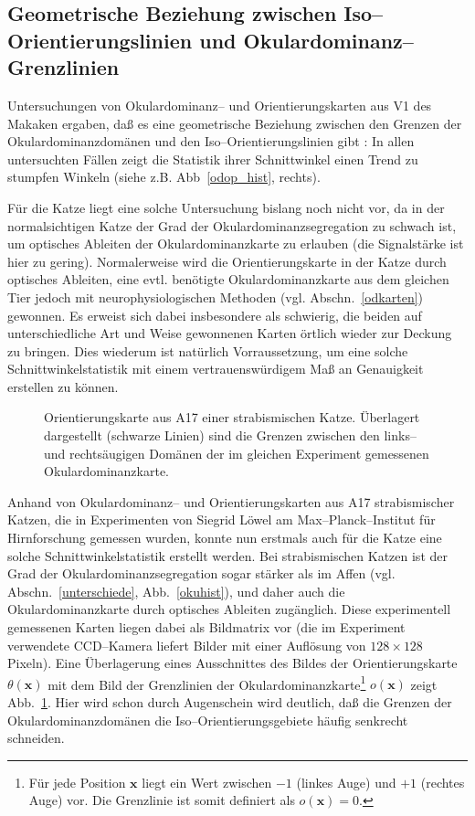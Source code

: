 \subsection[Geometrische Beziehung zwischen
Iso--Orientierungslinien$\ldots$]{Geometrische Beziehung zwischen
Iso--Orientierungslinien und Oku\-lar\-do\-minanz--Grenzlinien}
\label{90grad}

Untersuchungen von Okulardominanz-- und Orientierungskarten aus V1 des
Makaken ergaben, daß es eine geometrische Beziehung zwischen den Grenzen
der Okulardominanzdomänen und den Iso--Orientierungslinien gibt
\cite{bartfield:1992,oby:1993b}: In allen untersuchten Fällen zeigt die
Statistik ihrer Schnittwinkel einen Trend zu stumpfen Winkeln (siehe
z.B. Abb~\ref{odop_hist}, rechts).

Für die Katze liegt eine solche Untersuchung bislang noch nicht vor, da in
der normalsichtigen Katze der Grad der Okulardominanzsegregation zu schwach
ist, um optisches Ableiten der Okulardominanzkarte zu erlauben (die
Signalstärke ist hier zu gering). Normalerweise wird die
Orientierungskarte in der Katze durch optisches Ableiten, eine
evtl. benötigte Okulardominanzkarte aus dem gleichen Tier jedoch mit
neurophysiologischen Methoden (vgl. Abschn.~\ref{odkarten}) gewonnen. Es
erweist sich dabei insbesondere als schwierig, die beiden auf
unterschiedliche Art und Weise gewonnenen Karten örtlich wieder zur
Deckung zu bringen. Dies wiederum ist natürlich Vorraussetzung, um eine
solche Schnittwinkelstatistik mit einem vertrauenswürdigem Maß an
Genauigkeit erstellen zu können.

\begin{figure}[t]
    \centering
    \caption{Orientierungskarte aus A17 einer strabismischen Katze. Überlagert
    dargestellt (schwarze Linien) sind die Grenzen zwischen den links-- und
    rechtsäugigen Domänen der im gleichen Experiment gemessenen
    Okulardominanzkarte.}
    \label{odop_pict}
\end{figure}

Anhand von Okulardominanz-- und Orientierungskarten aus A17 strabismischer
Katzen, die in Experimenten von Siegrid Löwel am Max--Planck--Institut
für Hirnforschung gemessen wurden, konnte nun erstmals auch für die Katze
eine solche Schnittwinkelstatistik erstellt werden. Bei strabismischen
Katzen ist der Grad der Okulardominanzsegregation sogar stärker als im
Affen (vgl. Abschn.~\ref{unterschiede}, Abb.~\ref{okuhist}), und daher auch
die Okulardominanzkarte durch optisches Ableiten zugänglich. Diese
experimentell gemessenen Karten liegen dabei als Bildmatrix vor (die im
Experiment verwendete CCD--Kamera liefert Bilder mit einer Auflösung von
$128\times 128$ Pixeln). Eine Überlagerung eines Ausschnittes des Bildes
der Orientierungskarte $\theta(\mathbf{x})$ mit dem Bild der Grenzlinien
der Okulardominanzkarte\footnote{Für jede Position $\mathbf{x}$ liegt ein
Wert zwischen $-1$ (linkes Auge) und $+1$ (rechtes Auge) vor. Die
Grenzlinie ist somit definiert als $o(\mathbf{x}) = 0$.} $o(\mathbf{x})$
zeigt Abb.~\ref{odop_pict}. Hier wird schon durch Augenschein wird
deutlich, daß die Grenzen der Okulardominanzdomänen die
Iso--Orientierungsgebiete häufig senkrecht schneiden.
\setcounter{footnote}{1}


